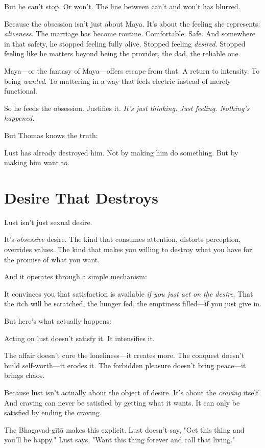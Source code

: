 \documentclass[11pt,twoside]{book}
\begin{document}
But he can't stop. Or won't. The line between can't and won't has blurred.

Because the obsession isn't just about Maya. It's about the feeling she represents: \emph{aliveness}. The marriage has become routine. Comfortable. Safe. And somewhere in that safety, he stopped feeling fully alive. Stopped feeling \emph{desired}. Stopped feeling like he matters beyond being the provider, the dad, the reliable one.

Maya—or the fantasy of Maya—offers escape from that. A return to intensity. To being \emph{wanted}. To mattering in a way that feels electric instead of merely functional.

So he feeds the obsession. Justifies it. \emph{It's just thinking. Just feeling. Nothing's happened.}

But Thomas knows the truth:

Lust has already destroyed him. Not by making him do something. But by making him want to.

\section*{Desire That Destroys}

Lust isn't just sexual desire.

It's \emph{obsessive} desire. The kind that consumes attention, distorts perception, overrides values. The kind that makes you willing to destroy what you have for the promise of what you want.

And it operates through a simple mechanism:

It convinces you that satisfaction is available \emph{if you just act on the desire}. That the itch will be scratched, the hunger fed, the emptiness filled—if you just give in.

But here's what actually happens:

Acting on lust doesn't satisfy it. It intensifies it.

The affair doesn't cure the loneliness—it creates more. The conquest doesn't build self-worth—it erodes it. The forbidden pleasure doesn't bring peace—it brings chaos.

Because lust isn't actually about the object of desire. It's about the \emph{craving} itself. And craving can never be satisfied by getting what it wants. It can only be satisfied by ending the craving.

The Bhagavad-gītā makes this explicit. Lust doesn't say, "Get this thing and you'll be happy." Lust says, "Want this thing forever and call that living."
\end{document}
